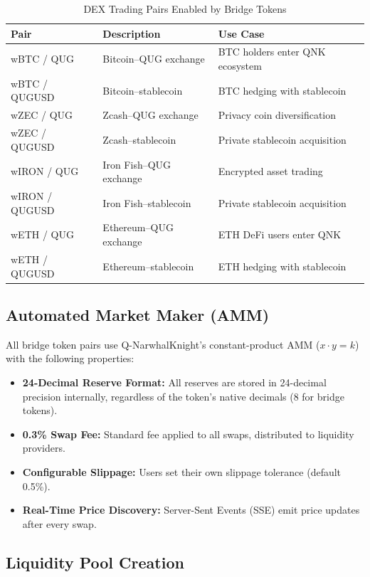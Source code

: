 \documentclass[11pt,a4paper]{article}
\begin{document}
\begin{table}[H]
\centering
\caption{DEX Trading Pairs Enabled by Bridge Tokens}
\begin{tabular}{l l l}
\toprule
\textbf{Pair} & \textbf{Description} & \textbf{Use Case} \\
\midrule
wBTC / QUG & Bitcoin--QUG exchange & BTC holders enter QNK ecosystem \\
wBTC / QUGUSD & Bitcoin--stablecoin & BTC hedging with stablecoin \\
wZEC / QUG & Zcash--QUG exchange & Privacy coin diversification \\
wZEC / QUGUSD & Zcash--stablecoin & Private stablecoin acquisition \\
wIRON / QUG & Iron Fish--QUG exchange & Encrypted asset trading \\
wIRON / QUGUSD & Iron Fish--stablecoin & Private stablecoin acquisition \\
wETH / QUG & Ethereum--QUG exchange & ETH DeFi users enter QNK \\
wETH / QUGUSD & Ethereum--stablecoin & ETH hedging with stablecoin \\
\bottomrule
\end{tabular}
\end{table}

\subsection{Automated Market Maker (AMM)}

All bridge token pairs use Q-NarwhalKnight's constant-product AMM ($x \cdot y = k$) with the following properties:

\begin{itemize}
    \item \textbf{24-Decimal Reserve Format:} All reserves are stored in 24-decimal precision internally, regardless of the token's native decimals (8 for bridge tokens).
    \item \textbf{0.3\% Swap Fee:} Standard fee applied to all swaps, distributed to liquidity providers.
    \item \textbf{Configurable Slippage:} Users set their own slippage tolerance (default 0.5\%).
    \item \textbf{Real-Time Price Discovery:} Server-Sent Events (SSE) emit price updates after every swap.
\end{itemize}

\subsection{Liquidity Pool Creation}
\end{document}
